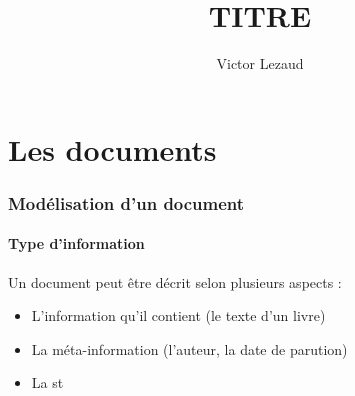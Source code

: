 \documentclass[10pt,a4paper,twoside]{article}
\author{Victor Lezaud}
\title{TITRE}
\begin{document}
\maketitle
\renewcommand{\contentsname}{Sommaire}
\tableofcontents

\newpage
\part{Les documents}
\section{Modélisation d'un document}
\subsection{Type d'information}
Un document peut être décrit selon plusieurs aspects :
\begin{itemize}
\item L'information qu'il contient (le texte d'un livre)
\item La méta-information (l'auteur, la date de parution)
\item La st
\end{itemize}
\end{document}
